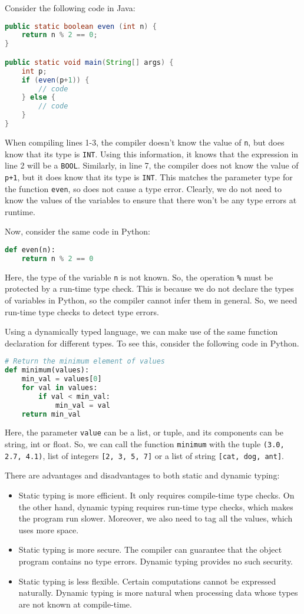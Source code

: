 \documentclass[a4paper, openany]{memoir}
\begin{document}
Consider the following code in Java:
\begin{lstlisting}[language=java]
public static boolean even (int n) {
    return n % 2 == 0;
}

public static void main(String[] args) {
    int p;
    if (even(p+1)) {
        // code
    } else {
        // code
    }
}
\end{lstlisting}
When compiling lines 1-3, the compiler doesn't know the value of \texttt{n}, but does know that its type is \texttt{INT}. Using this information, it knows that the expression in line 2 will be a \texttt{BOOL}. Similarly, in line 7, the compiler does not know the value of \texttt{p+1}, but it does know that its type is \texttt{INT}. This matches the parameter type for the function \texttt{even}, so does not cause a type error. Clearly, we do not need to know the values of the variables to ensure that there won't be any type errors at runtime.

Now, consider the same code in Python:
\begin{lstlisting}[language=python]
def even(n):
    return n % 2 == 0
\end{lstlisting}
Here, the type of the variable \texttt{n} is not known. So, the operation \texttt{\%} must be protected by a run-time type check. This is because we do not declare the types of variables in Python, so the compiler cannot infer them in general. So, we need run-time type checks to detect type errors.

Using a dynamically typed language, we can make use of the same function declaration for different types. To see this, consider the following code in Python.
\begin{lstlisting}[language=python]
# Return the minimum element of values
def minimum(values):
    min_val = values[0]
    for val in values:
        if val < min_val:
            min_val = val
    return min_val
\end{lstlisting}
Here, the parameter \texttt{value} can be a list, or tuple, and its components can be string, int or float. So, we can call the function \texttt{minimum} with the tuple \texttt{(3.0, 2.7, 4.1)}, list of integers \texttt{[2, 3, 5, 7]} or a list of string \texttt{[cat, dog, ant]}.

There are advantages and disadvantages to both static and dynamic typing:
\begin{itemize}
    \item Static typing is more efficient. It only requires compile-time type checks. On the other hand, dynamic typing requires run-time type checks, which makes the program run slower. Moreover, we also need to tag all the values, which uses more space.
    \item Static typing is more secure. The compiler can guarantee that the object program contains no type errors. Dynamic typing provides no such security.
    \item Static typing is less flexible. Certain computations cannot be expressed naturally. Dynamic typing is more natural when processing data whose types are not known at compile-time.
\end{itemize}
\end{document}
